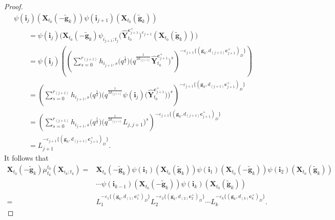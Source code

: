 \documentclass[10pt,a4paper]{amsart}
\numberwithin{equation}{section}
\begin{document}
\begin{proof}
\begin{gather*}
  \psi(\mathbf{i}_{j})(\mathbf{X}_{t_{0}}(-\mathbf{\tilde{g}}_{k}))\psi(\mathbf{i}_{j+1})(\mathbf{X}_{t_{0}}(\mathbf{\tilde{g}}_{k}))\\
  \qquad=\psi(\mathbf{i}_{j})\bigl(\mathbf{X}_{t_{0}}(-\mathbf{\tilde{g}}_{k})\psi_{i_{j+1};t_{j}}\bigl(\mathbf{\hat{Y}}_{t_0}^{\mathbf{c}_{j+1}^+}\bigr)^{\varepsilon_{j+1}}
  (\mathbf{X}_{t_{0}}(\mathbf{\tilde{g}}_{k}))\bigr)\\
 \qquad  =\psi(\mathbf{i}_{j})\left(\left(\sum\limits^{r_{(j+1)}}_{s=0}h_{i_{j+1},s}\bigl(q^{\frac{1}{2}}\bigr)
 \bigl(q^{\frac{1}{2d_{(j+1)}}}\mathbf{\hat{Y}}_{t_{0}}^{\mathbf{c}_{j+1}^{+}}\bigr)^{s}\right)
 ^{-\varepsilon_{j+1}\{(\mathbf{g}_{k},d_{(j+1)}\mathbf{c}_{j+1}^{+})_{D}\}}\right)\\
\qquad  =\left(\sum\limits^{r_{(j+1)}}_{s=0}h_{i_{j+1},s}\bigl(q^{\frac{1}{2}}\bigr)\bigl(q^{\frac{1}{2d_{(j+1)}}}\psi(\mathbf{i}_{j})\bigl(\mathbf{\hat{Y}}_{t_{0}}^{\mathbf{c}_{j+1}^{+}}\bigr)\bigr)^{s}\right)^{-\varepsilon_{j+1}\{(\mathbf{g}_{k},d_{(j+1)}\mathbf{c}_{j+1}^{+})_{D}\}}\\
\qquad  =\left(\sum\limits^{r_{(j+1)}}_{s=0}h_{i_{j+1},s}\bigl(q^{\frac{1}{2}}\bigr)\bigl(q^{\frac{1}{2d_{(j+1)}}}L_{j,j+1}\bigr)^{s}\right)^{-\varepsilon_{j+1}\{(\mathbf{g}_{k},d_{(j+1)}\mathbf{c}_{j+1}^{+})_{D}\}}\\
\qquad  =L_{j+1}^{-\varepsilon_{j+1}\{(\mathbf{g}_{k},d_{(j+1)}\mathbf{c}_{j+1}^{+})_{D}\}}.
 \end{gather*}
 It follows that
 \begin{align*}
 \mathbf{X}_{t_{0}}(-\mathbf{\tilde{g}}_{k})\mu_{t_{k}}^{t_{0}}(\mathbf{X}_{i_{k};t_{k}})
 ={}&\mathbf{X}_{t_{0}}(-\mathbf{\tilde{g}}_{k})\psi(\mathbf{i}_{1})(\mathbf{X}_{t_{0}}(\mathbf{\tilde{g}}_{k}))\psi(\mathbf{i}_{1})(\mathbf{X}_{t_{0}}(-\mathbf{\tilde{g}}_{k}))\psi(\mathbf{i}_{2})(\mathbf{X}_{t_{0}}(\mathbf{\tilde{g}}_{k}))\\
 &\cdots\psi(\mathbf{i}_{k-1})(\mathbf{X}_{t_{0}}(-\mathbf{\tilde{g}}_{k}))\psi(\mathbf{i}_{k})(\mathbf{X}_{t_{0}}(\mathbf{\tilde{g}}_{k}))\\
 ={}&L_{1}^{-\varepsilon_{1}\{(\mathbf{g}_{k},d_{(1)}\mathbf{c}_{1}^{+})_{D}\}}L_{2}^{-\varepsilon_{2}\{(\mathbf{g}_{k},d_{(2)}\mathbf{c}_{2}^{+})_{D}\}}\cdots L_{k}^{-\varepsilon_{k}\{(\mathbf{g}_{k},d_{(k)}\mathbf{c}_{k}^{+})_{D}\}}.\tag*{\qed}
 \end{align*}\renewcommand{\qed}{}
\end{proof}
\end{document}

